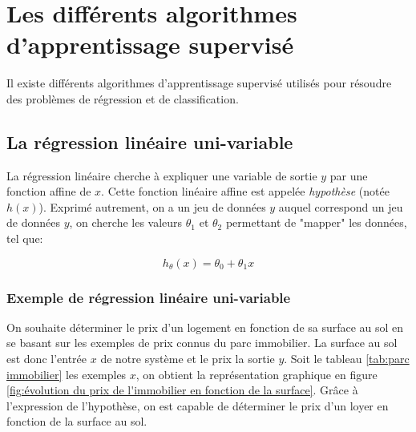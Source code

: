 \section{Les différents algorithmes d'apprentissage supervisé}
\label{Le Machine Learning:Les différents algorithmes d'apprentissage supervisé}
Il existe différents algorithmes d'apprentissage supervisé utilisés pour résoudre des problèmes de régression et de classification. 



\subsection{La régression linéaire uni-variable}
\label{Le Machine Learning:Les différents algorithmes d'apprentissage supervisé: La regression linéaire}
La régression linéaire cherche à expliquer une variable de sortie $y$ par une fonction affine de $x$. Cette fonction linéaire affine est appelée \emph{hypothèse} (notée $h(x)$). Exprimé autrement, on a un jeu de données $y$ auquel correspond un jeu de données $y$, on cherche les valeurs $\theta_1$ et $\theta_2$ permettant de "mapper" les données, tel que:

\begin{equation}
	h_\theta (x) = \theta_0 + \theta_1 x
\end{equation}


\subsubsection{Exemple de régression linéaire uni-variable}
\label{Le Machine Learning:Les différents algorithmes d'apprentissage supervisé: La regression linéaire: Exemple de régression linéaire uni-variable}
On souhaite déterminer le prix d'un logement en fonction de sa surface au sol en se basant sur les exemples de prix connus du parc immobilier. 
La surface au sol est donc l'entrée $x$ de notre système et le prix la sortie $y$. Soit le tableau \ref {tab:parc immobilier} les exemples $x$, on obtient la représentation graphique en figure \ref{fig:évolution du prix de l'immobilier en fonction de la surface}. Grâce à l'expression de l'hypothèse, on est capable de déterminer le prix d'un loyer en fonction de la surface au sol.  


